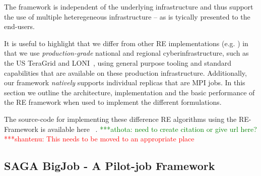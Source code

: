 \documentclass{rspublic}
\newcommand{\jhanote}[1]{ {\textcolor{red} { ***shantenu: #1 }}}
\newcommand{\athotanote}[1]{ {\textcolor{green} { ***athota: #1 }}}
\newcommand{\athotanote}[1]{}
\newcommand{\jhanote}[1]{}
\begin{document}
The framework is independent of the underlying infrastructure and thus
support the use of multiple heteregeneous infrastructure -- as is
tyically presented to the end-users.

It is useful to highlight that we differ from other RE implementations
(e.g.  \cite{parashar_arepex}) in that we use {\it production-grade}
national and regional cyberinfrastructure, such as the US TeraGrid and
LONI~\citep{LONI_web}, using general purpose tooling and standard
capabilities that are available on these production infrastructure.
Additionally, our framework {\it natively} supports individual
replicas that are MPI jobs. In this section we outline the
architecture, implementation and the basic performance of the RE
framework when used to implement the different formulations.

The source-code for implementing these difference RE algorithms using
the RE-Framework is available here ~\citep{async-re_url}. \athotanote{need to
  create citation or give url here?} \jhanote{This needs to be moved
  to an appropriate place}



\subsection{SAGA BigJob - A Pilot-job Framework}
\label{sec:BigJob}

\end{document}
